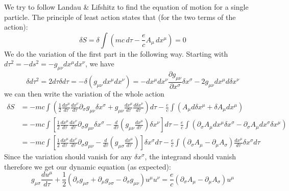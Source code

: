 We try to follow Landau \& Lifshitz to find the equation of motion for a single
particle. The principle of least action states that (for the two terms of the
action):
\begin{equation}
  \label{eq:9}
  \delta S = \delta \int \left(mc\,d\tau - \frac{e}{c} A_{\mu}\,dx^{\mu}\right) = 0
\end{equation}
We do the variation of the first part in the following way. Starting with
$d\tau^2 = -ds^2 = -g_{\mu\nu}dx^{\mu}dx^{\nu}$, we have
\begin{equation}
  \label{eq:12}
  \delta d\tau^2 = 2d\tau \delta d\tau = -\delta(g_{\mu\nu}dx^{\mu}dx^{\nu}) = -dx^{\mu}dx^{\nu}\frac{\partial g_{\mu\nu}}{\partial x^{\sigma}}\delta x^{\sigma} - 2g_{\mu\nu}dx^{\mu}d \delta x^{\nu}
\end{equation}
we can then write the variation of the whole action
\begin{equation}
  \label{eq:13}
  \begin{split}
    \delta S &= -mc\int \left( \frac{1}{2}\frac{dx^{\mu}}{d\tau}\frac{dx^{\nu}}{d\tau}\partial_{\sigma}g_{\mu\nu}\delta x^{\sigma} + g_{\mu\nu}\frac{dx^{\mu}}{d\tau}\frac{d\delta x^{\nu}}{d\tau} \right) d\tau - \frac{e}{c}\int \left( A_{\mu}d\delta x^{\mu} + \delta A_{\mu} dx^{\mu} \right) \\
    &= -mc\int \left[ \frac{1}{2}\frac{dx^{\mu}}{d\tau}\frac{dx^{\nu}}{d\tau}\partial_{\sigma}g_{\mu\nu}\delta x^{\sigma} - \frac{d}{d\tau}\left( g_{\mu\nu}\frac{dx^{\mu}}{d\tau} \right) \delta x^{\nu} \right]d\tau - \frac{e}{c}\int \left( \partial_{\sigma}A_{\mu}dx^{\mu}\delta x^{\sigma} - \partial_{\sigma}A_{\mu}dx^{\sigma}\delta x^{\mu} \right) \\
    &= -mc\int \left[ \frac{1}{2}\frac{dx^{\mu}}{d\tau}\frac{dx^{\nu}}{d\tau}\partial_{\sigma}g_{\mu\nu} - \frac{d}{d\tau}\left( g_{\mu\sigma}\frac{dx^{\mu}}{d\tau} \right) \right]\delta x^{\sigma} d\tau - \frac{e}{c}\int (\partial_{\sigma}A_{\mu} - \partial_{\mu}A_{\sigma})\frac{dx^{\mu}}{d\tau}\delta x^{\sigma}d\tau
  \end{split}
\end{equation}
Since the variation should vanish for any $\delta x^{\sigma}$, the integrand
should vanish therefore we get our dynamic equation (as expected):
\begin{equation}
  \label{eq:16}
  g_{\mu\sigma}\frac{du^{\mu}}{d\tau} + \frac{1}{2}\left( \partial_{\nu}g_{\mu\sigma} + \partial_{\mu}g_{\nu\sigma} - \partial_{\sigma}g_{\mu\nu} \right)u^{\mu}u^{\nu} = \frac{e}{c}(\partial_{\sigma}A_{\mu} - \partial_{\mu}A_{\sigma})u^{\mu}
\end{equation}
